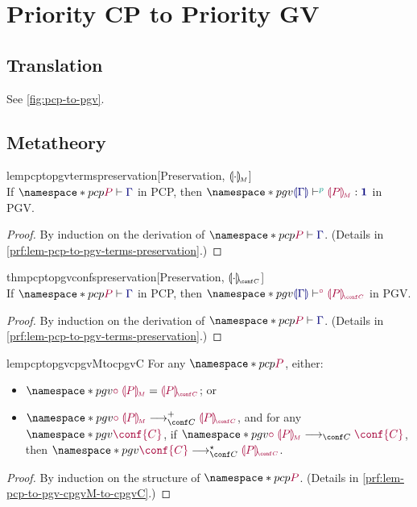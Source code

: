 \documentclass[main.tex]{subfiles}
\begin{document}
\section{Priority CP to Priority GV}

\subsection{Translation}
See \cref{fig:pcp-to-pgv}.


\subsection{Metatheory}

\begin{restatablelemma}{lempcptopgvtermspreservation}[Preservation, $\llparenthesis\cdot\rrparenthesis_{\!\scriptscriptstyle{M}}$]
  \label{lem:pcp-to-pgv-terms-preservation}
  \hfill\\%
  If $\pcp{\seq{P}{\ty{\Gamma}}}$ in PCP,
  then $\pgv{\tseq[\cs{p}]{\ty{\cpgvT{\Gamma}}}{\cpgvM{P}}{\tyunit}}$ in PGV.
\end{restatablelemma}
\begin{proof}
  By induction on the derivation of $\pcp{\seq{P}{\ty{\Gamma}}}$.
  (Details in \cref{prf:lem-pcp-to-pgv-terms-preservation}.)
\end{proof}

\begin{restatabletheorem}{thmpcptopgvconfspreservation}[Preservation, $\cpgvC{\cdot}$]
  \label{thm:pcp-to-pgv-confs-preservation}
  \hfill\\%
  If $\pcp{\seq{P}{\ty{\Gamma}}}$ in PCP,
  then $\pgv{\cseq[\child]{\ty{\cpgvT{\Gamma}}}{\cpgvC{P}}}$ in PGV.
\end{restatabletheorem}
\begin{proof}
  By induction on the derivation of $\pcp{\seq{P}{\ty{\Gamma}}}$.
  (Details in \cref{prf:lem-pcp-to-pgv-terms-preservation}.)
\end{proof}

\begin{restatablelemma}{lempcptopgvcpgvMtocpgvC}
  \label{lem:pcp-to-pgv-cpgvM-to-cpgvC}
  For any $\pcp{\tm{P}}$, either:
  \begin{itemize}
  \item $\pgv{\tm{\child\;\cpgvM{P}}=\tm{\cpgvC{P}}}$; or
  \item   $\pgv{\tm{\child\;\cpgvM{P}}\cred^+\tm{\cpgvC{P}}}$, and for any $\pgv{\tm{\conf{C}}}$, if $\pgv{\tm{\child\;\cpgvM{P}}\cred\tm{\conf{C}}}$, then $\pgv{\tm{\conf{C}}\cred^\star\tm{\cpgvC{P}}}$.
  \end{itemize}
\end{restatablelemma}
\begin{proof}
  By induction on the structure of $\pcp{\tm{P}}$.
  (Details in \cref{prf:lem-pcp-to-pgv-cpgvM-to-cpgvC}.)
\end{proof}
\end{document}
